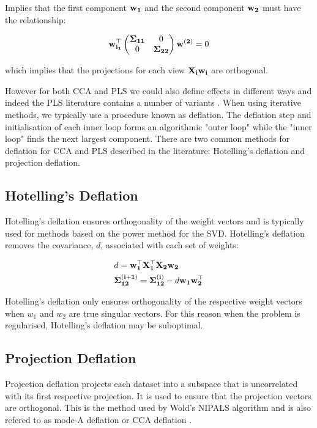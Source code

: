 Implies that the first component $\bold{w_1}$ and the second component $\bold{w_2}$ must have the relationship:

\begin{align}
    \bold{w_{i_1}^{\top}\begin{pmatrix}\bold{\Sigma_{11}} & 0 \\0 & \bold{\Sigma_{22}}
                        \end{pmatrix}w^{(2)}}=0
\end{align}

which implies that the projections for each view $\bold{X_iw_i}$ are orthogonal.

However for both CCA and PLS we could also define effects in different ways and indeed the PLS literature contains a number of variants\cite{hoskuldsson1988pls} \cite{wegelin2000survey}. When using iterative methods, we typically use a procedure known as deflation. The deflation step and initialisation of each inner loop forms an algorithmic "outer loop" while the "inner loop" finds the next largest component. There are two common methods for deflation for CCA and PLS described in the literature: Hotelling's deflation and projection deflation.

\subsection{Hotelling's Deflation}
Hotelling's deflation ensures orthogonality of the weight vectors and is typically used for methods based on the power method for the SVD. Hotelling's deflation removes the covariance, $d$, associated with each set of weights:

\begin{align}
     & d = \bold{w^{\top}_1X^{\top}_1X_2w_2}                                        \\
     & \bold{\Sigma^{(i+1)}_{12}}= \bold{\Sigma^{(i)}_{12}} - d\bold{w_1w^{\top}_2}
\end{align}

Hotelling's deflation only ensures orthogonality of the respective weight vectors when $w_1$ and $w_2$ are true singular vectors. For this reason when the problem is regularised, Hotelling's deflation may be suboptimal.

\subsection{Projection Deflation}

Projection deflation projects each dataset into a subspace that is uncorrelated with its first respective projection. It is used to ensure that the projection vectors are orthogonal. This is the method used by Wold's NIPALS algorithm and is also refered to as mode-A deflation or CCA deflation \cite{mackey2009deflation}.


